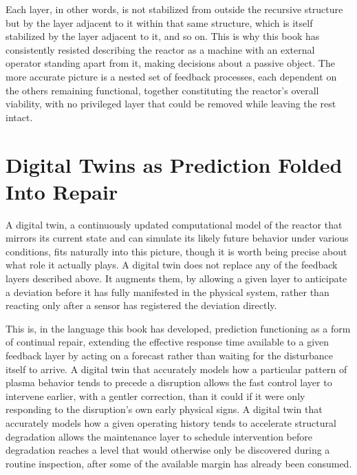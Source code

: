 Each layer, in other words, is not stabilized from outside the recursive structure but by the layer adjacent to it within that same structure, which is itself stabilized by the layer adjacent to it, and so on. This is why this book has consistently resisted describing the reactor as a machine with an external operator standing apart from it, making decisions about a passive object. The more accurate picture is a nested set of feedback processes, each dependent on the others remaining functional, together constituting the reactor's overall viability, with no privileged layer that could be removed while leaving the rest intact.

\section{Digital Twins as Prediction Folded Into Repair}

A digital twin, a continuously updated computational model of the reactor that mirrors its current state and can simulate its likely future behavior under various conditions, fits naturally into this picture, though it is worth being precise about what role it actually plays. A digital twin does not replace any of the feedback layers described above. It augments them, by allowing a given layer to anticipate a deviation before it has fully manifested in the physical system, rather than reacting only after a sensor has registered the deviation directly.

This is, in the language this book has developed, prediction functioning as a form of continual repair, extending the effective response time available to a given feedback layer by acting on a forecast rather than waiting for the disturbance itself to arrive. A digital twin that accurately models how a particular pattern of plasma behavior tends to precede a disruption allows the fast control layer to intervene earlier, with a gentler correction, than it could if it were only responding to the disruption's own early physical signs. A digital twin that accurately models how a given operating history tends to accelerate structural degradation allows the maintenance layer to schedule intervention before degradation reaches a level that would otherwise only be discovered during a routine inspection, after some of the available margin has already been consumed.

